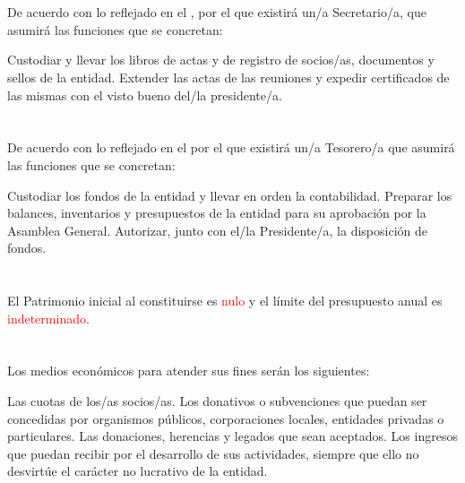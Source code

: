 \documentclass[draft]{estatutos}
\begin{document}
\begin{linenumbers}[1]
  \section{}
  De acuerdo con lo reflejado en el , por el que existirá un/a
  Secretario/a, que asumirá las funciones que se concretan:

  \begin{enumerate}
  \sub Custodiar y llevar los libros de actas y de registro de socios/as,
      documentos y sellos de la entidad.
  \sub Extender las actas de las reuniones y expedir certificados de las mismas
      con el visto bueno del/la presidente/a.
  \end{enumerate}

  \section{}
  De acuerdo con lo reflejado en el  por el que existirá un/a Tesorero/a
  que asumirá las funciones que se concretan:

  \begin{enumerate}
  \sub Custodiar los fondos de la entidad y llevar en orden la contabilidad.
  \sub Preparar los balances, inventarios y presupuestos de la entidad para su
      aprobación por la Asamblea General.
  \sub Autorizar, junto con el/la Presidente/a, la disposición de fondos.
  \end{enumerate}


  \section{}
  El Patrimonio inicial al constituirse es \textcolor{red}{nulo} y el límite del presupuesto
  anual es \textcolor{red}{indeterminado}.

  \section{}
  Los medios económicos para atender sus fines serán los siguientes:

  \begin{enumerate}
  \sub Las cuotas de los/as socios/as.
  \sub Los donativos o subvenciones que puedan ser concedidas por organismos
      públicos, corporaciones locales, entidades privadas o particulares.
  \sub Las donaciones, herencias y legados que sean aceptados.
  \sub Los ingresos que puedan recibir por el desarrollo de sus actividades,
      siempre que ello no desvirtúe el carácter no lucrativo de la entidad.
  \end{enumerate}


\end{linenumbers}
\end{document}
